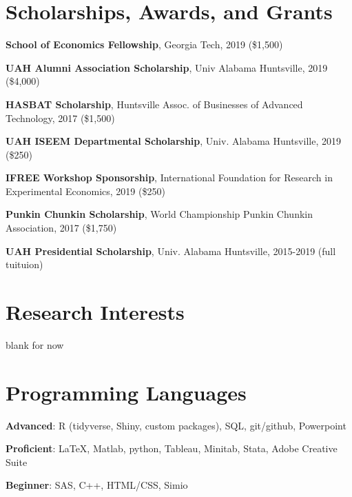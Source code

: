 \documentclass[margin,line]{res}
\begin{document}
\begin{resume}
\section{\sc Scholarships, Awards, and Grants} 

{\bf School of Economics Fellowship}, Georgia Tech, 2019 (\$1,500)
\vspace*{-3.5mm}

{\bf UAH Alumni Association Scholarship}, Univ Alabama Huntsville, 2019 (\$4,000)
\vspace*{-3.5mm}

{\bf HASBAT Scholarship}, Huntsville Assoc. of Businesses of Advanced Technology, 2017 (\$1,500)
\vspace*{-3.5mm}

{\bf UAH ISEEM Departmental Scholarship}, Univ. Alabama Huntsville, 2019 (\$250)
\vspace*{-3.5mm}

{\bf IFREE Workshop Sponsorship}, International Foundation for Research in Experimental Economics, 2019 (\$250)
\vspace*{-3.5mm}

{\bf Punkin Chunkin Scholarship}, World Championship Punkin Chunkin Association, 2017 (\$1,750)
\vspace*{-3.5mm}

{\bf UAH Presidential Scholarship}, Univ. Alabama Huntsville, 2015-2019 (full tuituion)
\vspace*{-3.5mm}




\section{\sc Research Interests}
blank for now
\vspace*{1.5cm}


\section{\sc Programming Languages} 
{\bf Advanced}:  R (tidyverse, Shiny, custom packages), SQL, git/github, Powerpoint
\vspace*{-3mm}

{\bf Proficient}:  \LaTeX, Matlab, python, Tableau, Minitab, Stata, Adobe Creative Suite
\vspace*{-3mm}

{\bf Beginner}:  SAS, C++, HTML/CSS, Simio
\vspace*{-3mm}


\end{resume}
\end{document}
